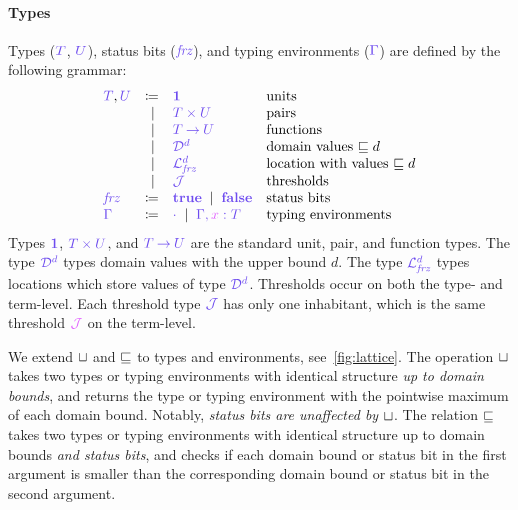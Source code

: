 \documentclass[main.tex]{subfiles}
\begin{document}
\paragraph*{Types}
Types ($\ty{T}$, $\ty{U}$), status bits ($\ty{\frz}$), and typing environments ($\ty{\Gamma}$) are defined by the following grammar:
\[
\begin{array}{lrll}
  \ty{T}, \ty{U}
  & \coloneqq & \ty{\tyunit}        & \text{units} \\
  & \sep      & \ty{\typrod{T}{U}}  & \text{pairs} \\
  & \sep      & \ty{\tyfun{T}{U}}   & \text{functions}\\
  & \sep      & \ty{\tyD{d}}        & \text{domain values }{\sqsubseteq d}\\
  & \sep      & \ty{\tyL{\frz}{d}}  & \text{location with values }{\sqsubseteq d}\\
  & \sep      & \ty{\tyJ}           & \text{thresholds}
  \\
  \ty{\frz}
  & \coloneqq & \ty{\true}
    \sep        \ty{\false}
                                    & \text{status bits}
  \\
  \ty{\Gamma}
  & \coloneqq & \ty{\emptyenv}
    \sep        \ty{\ty{\Gamma},\tmty{x}{T}}
                                    & \text{typing environments}
\end{array}
\]
Types $\ty{\tyunit}$, $\ty{\typrod{T}{U}}$, and $\ty{\tyfun{T}{U}}$ are the standard unit, pair, and function types.
The type $\tyD{d}$ types domain values with the upper bound $d$.
The type $\tyL{\frz}{d}$ types locations which store values of type $\tyD{d}$.
Thresholds occur on both the type- and term-level. Each threshold type $\tyJ$ has only one inhabitant, which is the same threshold $\tmJ$ on the term-level.

We extend $\mathbin{{\color{black}\sqcup}}$ and $\mathbin{{\color{black}\sqsubseteq}}$ to types and environments, see~\cref{fig:lattice}.
The operation $\mathbin{{\color{black}\sqcup}}$ takes two types or typing environments with identical structure \emph{up to domain bounds}, and returns the type or typing environment with the pointwise maximum of each domain bound. Notably, \emph{status bits are unaffected by $\mathbin{{\color{black}\sqcup}}$}.
The relation $\mathbin{{\color{black}\sqsubseteq}}$ takes two types or typing environments with identical structure up to domain bounds \emph{and status bits}, and checks if each domain bound or status bit in the first argument is smaller than the corresponding domain bound or status bit in the second argument.


\end{document}
